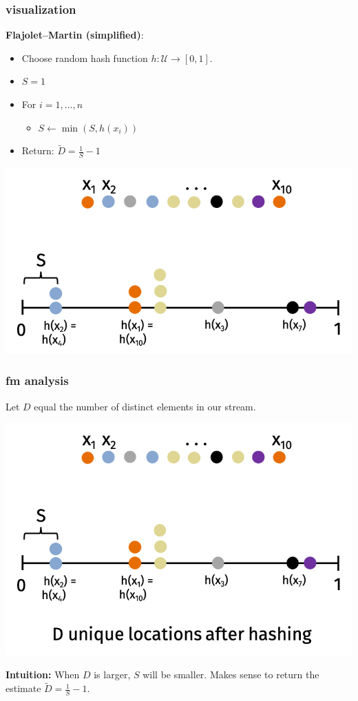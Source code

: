 \documentclass[handout,compress]{beamer}
\begin{document}
\begin{frame}
	\frametitle{visualization}
	\small
	\textbf{Flajolet–Martin (simplified)}:
	\vspace{-.5em}
	\begin{itemize}
		\item Choose random hash function $h: \mathcal{U} \rightarrow [0,1]$.
		\vspace{-.25em}
		\item $S = 1$ 
		\vspace{-.25em}
		\item For $i = 1, \ldots, n$
		\vspace{-.25em}
		\begin{itemize}
			\vspace{-.25em}
			\item $S \leftarrow \min(S, h(x_i))$
		\end{itemize} 
		\vspace{-.25em}
		\item Return: $\tilde{D} = \frac{1}{S} - 1$
	\end{itemize}
\vspace{-.5em}
	\begin{center}
	\includegraphics[width=.75\textwidth]{better_minhash_cut.png}
	\end{center}
\end{frame}


\begin{frame}
	\frametitle{fm analysis}	
	Let $D$ equal the number of distinct elements in our stream.
	\begin{center}
	\includegraphics[width=.7\textwidth]{better_minhash.png}
	\end{center}
	\textbf{Intuition:} When $D$ is larger, $S$ will be smaller. Makes sense to return the estimate $\tilde{D} = \frac{1}{S}-1$.
\end{frame}
\end{document}
